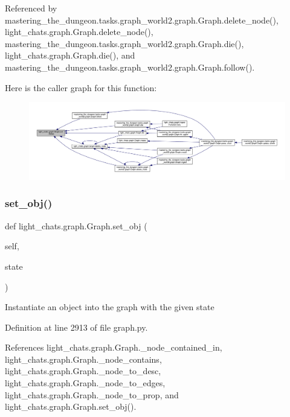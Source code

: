 Referenced by mastering\+\_\+the\+\_\+dungeon.\+tasks.\+graph\+\_\+world2.\+graph.\+Graph.\+delete\+\_\+node(), light\+\_\+chats.\+graph.\+Graph.\+delete\+\_\+node(), mastering\+\_\+the\+\_\+dungeon.\+tasks.\+graph\+\_\+world2.\+graph.\+Graph.\+die(), light\+\_\+chats.\+graph.\+Graph.\+die(), and mastering\+\_\+the\+\_\+dungeon.\+tasks.\+graph\+\_\+world2.\+graph.\+Graph.\+follow().

Here is the caller graph for this function\+:
\nopagebreak
\begin{figure}[H]
\begin{center}
\leavevmode
\includegraphics[width=350pt]{classlight__chats_1_1graph_1_1Graph_a729d07bc1da395a60d3431cec5bb439b_icgraph}
\end{center}
\end{figure}
\mbox{\label{classlight__chats_1_1graph_1_1Graph_ac46849fddce61ce035feb6ea683b9009}} 
\subsubsection{\texorpdfstring{set\+\_\+obj()}{set\_obj()}}
{\footnotesize\ttfamily def light\+\_\+chats.\+graph.\+Graph.\+set\+\_\+obj (\begin{DoxyParamCaption}\item[{}]{self,  }\item[{}]{state }\end{DoxyParamCaption})}

\begin{DoxyVerb}Instantiate an object into the graph with the given state\end{DoxyVerb}
 

Definition at line 2913 of file graph.\+py.



References light\+\_\+chats.\+graph.\+Graph.\+\_\+node\+\_\+contained\+\_\+in, light\+\_\+chats.\+graph.\+Graph.\+\_\+node\+\_\+contains, light\+\_\+chats.\+graph.\+Graph.\+\_\+node\+\_\+to\+\_\+desc, light\+\_\+chats.\+graph.\+Graph.\+\_\+node\+\_\+to\+\_\+edges, light\+\_\+chats.\+graph.\+Graph.\+\_\+node\+\_\+to\+\_\+prop, and light\+\_\+chats.\+graph.\+Graph.\+set\+\_\+obj().



